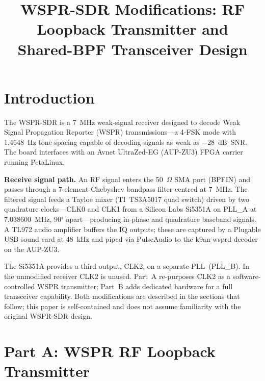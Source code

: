 \documentclass[conference]{IEEEtran}
\begin{document}
\title{WSPR-SDR Modifications: RF Loopback Transmitter and\\Shared-BPF Transceiver Design}

\author{
}

\maketitle
\raggedbottom

\section{Introduction}

The WSPR-SDR is a 7~MHz weak-signal receiver designed to decode Weak Signal
Propagation Reporter (WSPR) transmissions---a 4-FSK mode with 1.4648~Hz tone
spacing capable of decoding signals as weak as $-28$~dB~SNR. The board interfaces
with an Avnet UltraZed-EG (AUP-ZU3) FPGA carrier running PetaLinux.

\textbf{Receive signal path.} An RF signal enters the 50~$\Omega$ SMA port (BPFIN)
and passes through a 7-element Chebyshev bandpass filter centred at 7~MHz. The
filtered signal feeds a Tayloe mixer (TI~TS3A5017 quad switch) driven by two
quadrature clocks---CLK0 and CLK1 from a Silicon Labs Si5351A on PLL\_A at
7.038600~MHz, 90$^\circ$ apart---producing in-phase and quadrature baseband
signals. A TL972 audio amplifier buffers the IQ outputs; these are captured by a
Plugable USB sound card at 48~kHz and piped via PulseAudio to the k9an-wsprd
decoder on the AUP-ZU3.

The Si5351A provides a third output, CLK2, on a separate PLL~(PLL\_B). In the
unmodified receiver CLK2 is unused. Part~A re-purposes CLK2 as a
software-controlled WSPR transmitter; Part~B adds dedicated hardware for a full
transceiver capability. Both modifications are described in the sections that
follow; this paper is self-contained and does not assume familiarity with the
original WSPR-SDR design.

\section{Part A: WSPR RF Loopback Transmitter}
\end{document}

